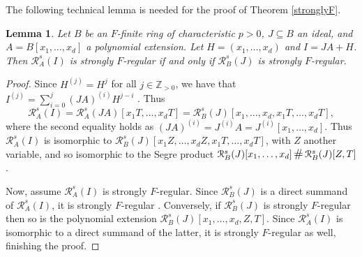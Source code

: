 \documentclass[12pt]{amsart}
\newtheorem{lemma}[lemma]{Lemma}
\theoremstyle{definition}
\newtheorem{remark}[remark]{Remark}
\renewcommand{\(}{\left(}
\renewcommand{\)}{\right)}
\newcommand{\NN}{\mathbb{N} }
\newcommand{\ZZ}{\mathbb{Z}}
\newcommand{\cR}{\mathcal{R}}
\renewcommand{\!}[1]{{\color{red}\text{\Huge$\star$ }#1}}
\begin{document}

The following technical lemma is needed for the proof of Theorem \ref{stronglyF}.

\begin{lemma}\label{Lemma sfr} Let $B$ be an $F$-finite ring of characteristic $p>0$, $J \subseteq B$ an ideal, and $A=B[x_1,\ldots,x_d]$ a polynomial extension. Let $H=(x_1,\ldots,x_d)$ and  $I=JA+H$. Then $\cR^s_A(I)$ is strongly $F$-regular if and only if $\cR^s_B(J)$ is strongly $F$-regular.
\end{lemma}
\begin{proof}
Since $H^{(j)}=H^j$ for all $j \in \ZZ_{>0}$,   we have that $I^{(j)} = \sum_{i=0}^j (JA)^{(i)}H^{j-i}$  \cite[Theorem 3.4]{BinomialSumSP}. Thus
\[
\cR^s_A(I) = \cR^s_A(JA)[x_1T,\ldots,x_dT]=\cR^s_B(J)[x_1,\ldots,x_d,x_1T,\ldots,x_dT],
\]
where the second equality holds as   $(JA)^{(i)} = J^{(i)}A = J^{(i)}[x_1,\ldots,x_d]$. Thus $\cR^s_A(I)$ is isomorphic to $\cR^s_B(J)[x_1Z,\ldots,x_dZ,x_1T,\ldots,x_dT]$, with $Z$ another variable, and so isomorphic to the Segre product  $\cR^s_B(J)[x_1,\ldots,x_d]\,
{\mathlarger{\mathlarger\#}}\,\cR^s_B(J)[Z,T]$. %

Now, assume  $\cR^s_A(I)$ is strongly $F$-regular. Since $\cR^s_B(J)$ is a direct summand of $\cR^s_A(I)$, it is strongly $F$-regular  \cite[Theorem 3.1(e)]{HHStrongFreg}. Conversely, if $\cR^s_B(J)$ is strongly $F$-regular then so is the polynomial extension $\cR^s_B(J)[x_1,\ldots,x_d,Z,T]$. Since $\cR^s_A(I)$ is isomorphic to %
a direct summand of the latter, it is  strongly $F$-regular as well, finishing the proof. 
\end{proof}
\end{document}
